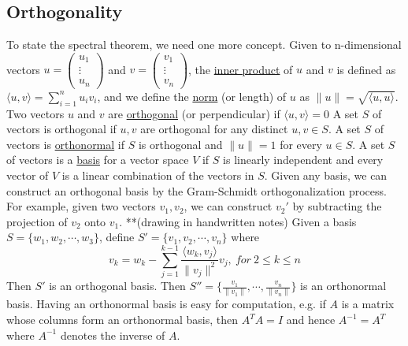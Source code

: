 \documentclass[11pt,a4paper]{report}
\theoremstyle{theoremdd}
\theoremstyle{claims1}
\theoremstyle{proofs1}
\begin{document}
\subsection{Orthogonality}
To state the spectral theorem, we need one more concept.
\newline Given to n-dimensional vectors 
$u=\begin{pmatrix} u_1 \\ \vdots \\ u_n \end{pmatrix}$ and 
$v=\begin{pmatrix} v_1 \\ \vdots \\ v_n \end{pmatrix}$, the \underline{inner product} of $u$ and $v$ is defined as $\langle u,v\rangle = \sum_{i=1}^{n}u_i v_i$, and we define the \underline{norm} (or length) of $u$ as $\| u \| = \sqrt{\langle u,u \rangle}$.
\newline Two vectors $u$ and $v$ are \underline{orthogonal} (or perpendicular) if $\langle u,v\rangle = 0$ 
\newline A set $S$ of vectors is orthogonal if $u,v$ are orthogonal for any distinct $u,v\in S$.
\newline A set $S$ of vectors is \underline{orthonormal} if $S$ is orthogonal and $\| u \| = 1$ for every $u\in S$.
\newline A set $S$ of vectors is a \underline{basis} for a vector space $V$ if $S$ is linearly independent and every vector of $V$ is a linear combination of the vectors in $S$.
\newline Given any basis, we can construct an orthogonal basis by the Gram-Schmidt orthogonalization process. For example, given two vectors $v_1 , v_2$, we can construct ${v_2}'$ by subtracting the projection of $v_2$ onto $v_1$. **(drawing in handwritten notes)
\newline Given a basis $S = \{w_1 , w_2 ,\cdots, w_3\}$, define $S' = \{v_1 , v_2 ,\cdots, v_n\}$ where
\[ v_k = w_k - \sum_{j=1}^{k-1} \frac{\langle w_k , v_j \rangle}{\| v_j\|^2} v_j , \ for \ 2\leq k \leq n
\]
Then $S'$ is an orthogonal basis.
\newline Then $S'' = \{ \frac{v_1}{\|v_1\|}, \cdots , \frac{v_n}{\|v_n\|}\}$ is an orthonormal basis.
\newline Having an orthonormal basis is easy for computation, e.g. if $A$ is a matrix whose columns form an orthonormal basis, then $A^T A = I$ and hence $A^{-1} = A^T$ where $A^{-1}$ denotes the inverse of $A$.
\end{document}
